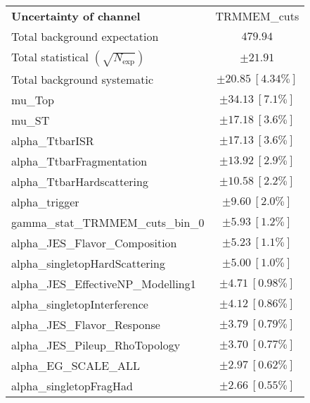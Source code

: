 
\begin{table}
\begin{center}
\setlength{\tabcolsep}{0.0pc}
\begin{tabular*}{\textwidth}{@{\extracolsep{\fill}}lc}
\noalign{\smallskip}\hline\noalign{\smallskip}
{\textbf{Uncertainty of channel}}                                    & TRMMEM\_cuts            \\
\noalign{\smallskip}\hline\noalign{\smallskip}
Total background expectation             &  $479.94$       \\
\noalign{\smallskip}\hline\noalign{\smallskip}
Total statistical $(\sqrt{N_{\mathrm{exp}}})$              & $\pm 21.91$       \\
Total background systematic               & $\pm 20.85\ [4.34\%] $             \\
\noalign{\smallskip}\hline\noalign{\smallskip}
\noalign{\smallskip}\hline\noalign{\smallskip}
mu\_Top         & $\pm 34.13\ [7.1\%] $       \\
mu\_ST         & $\pm 17.18\ [3.6\%] $       \\
alpha\_TtbarISR         & $\pm 17.13\ [3.6\%] $       \\
alpha\_TtbarFragmentation         & $\pm 13.92\ [2.9\%] $       \\
alpha\_TtbarHardscattering         & $\pm 10.58\ [2.2\%] $       \\
alpha\_trigger         & $\pm 9.60\ [2.0\%] $       \\
gamma\_stat\_TRMMEM\_cuts\_bin\_0         & $\pm 5.93\ [1.2\%] $       \\
alpha\_JES\_Flavor\_Composition         & $\pm 5.23\ [1.1\%] $       \\
alpha\_singletopHardScattering         & $\pm 5.00\ [1.0\%] $       \\
alpha\_JES\_EffectiveNP\_Modelling1         & $\pm 4.71\ [0.98\%] $       \\
alpha\_singletopInterference         & $\pm 4.12\ [0.86\%] $       \\
alpha\_JES\_Flavor\_Response         & $\pm 3.79\ [0.79\%] $       \\
alpha\_JES\_Pileup\_RhoTopology         & $\pm 3.70\ [0.77\%] $       \\
alpha\_EG\_SCALE\_ALL         & $\pm 2.97\ [0.62\%] $       \\
alpha\_singletopFragHad         & $\pm 2.66\ [0.55\%] $       \\

\end{tabular*}
\end{center}
\end{table}
